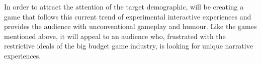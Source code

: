 In order to attract the attention of the target demographic, \ourteam{} will be creating a game that follows this current trend of experimental interactive experiences and provides the audience with unconventional gameplay and humour. Like the games mentioned above, it will appeal to an audience who, frustrated with the restrictive ideals of the big budget game industry, is looking for unique narrative experiences.